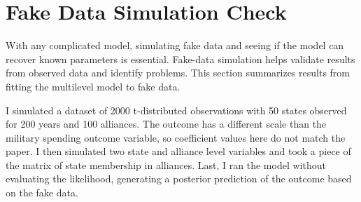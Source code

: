 \documentclass[12pt]{article}
\begin{document}
%



\section{Fake Data Simulation Check}


With any complicated model, simulating fake data and seeing if the model can recover known parameters is essential. 
Fake-data simulation helps validate results from observed data and identify problems. 
This section summarizes results from fitting the multilevel model to fake data.


I simulated a dataset of 2000 t-distributed observations with 50 states observed for 200 years and 100 alliances. 
The outcome has a different scale than the military spending outcome variable, so coefficient values here do not match the paper.  
I then simulated two state and alliance level variables and took a piece of the matrix of state membership in alliances. 
Last, I ran the model without evaluating the likelihood, generating a posterior prediction of the outcome based on the fake data.
\end{document}
